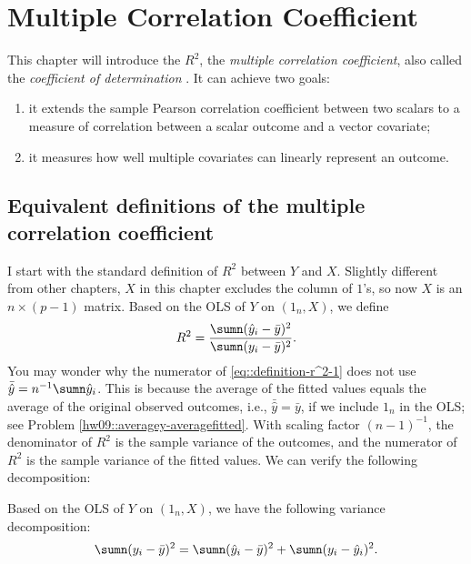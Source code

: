  
\chapter{Multiple Correlation Coefficient}
 
This chapter will introduce the $R^2$,  the {\it multiple correlation coefficient}, also called the {\it coefficient of determination} \citep{sewall1921correlation}. It can achieve two goals: 
\begin{enumerate}[label=(G\arabic*), ref=G\arabic*]
\item
it extends the sample Pearson correlation
coefficient between two scalars to a measure of correlation between a
scalar outcome and a vector covariate;

\item 
it measures how well multiple covariates
can linearly represent an outcome.
\end{enumerate}


  
 

\section{Equivalent definitions of the multiple correlation coefficient}

I start with the standard definition of $R^{2}$ between $Y$ and $X$.  
Slightly different from other chapters, $X$ in this chapter excludes the column of $1$'s, so now $X$ is an $n\times (p-1)$ matrix. Based on the OLS of $Y$ on $(1_n, X)$, we define 
\begin{equation}
\label{eq::definition-r^2-1}
R^{2}=\frac{\sumn(\hat{y}_{i}-\bar{y})^{2}}{\sumn(y_{i}-\bar{y})^{2}}.
\end{equation}
You may wonder why the numerator of \eqref{eq::definition-r^2-1} does not use $\bar{\hat{y}} = n^{-1}\sumn\hat{y}_{i}$. This is because the average of the fitted values equals the average of the original observed
outcomes, i.e., $\bar{\hat{y}}  = \bar{y}$, if we include $1_{n}$ in the OLS; see Problem \ref{hw09::averagey-averagefitted}. 
With scaling factor $(n-1)^{-1}$, the denominator
of $R^{2}$ is the sample variance of the outcomes, and the numerator
of $R^{2}$ is the sample variance of the fitted values. We can verify
the following decomposition:
\begin{lemma} 
\label{lemma:The-total-sum}
Based on the OLS of $Y$ on $(1_n, X)$, we have the following variance decomposition: 
\[
\sumn(y_{i}-\bar{y})^{2}=\sumn(\hat{y}_{i}-\bar{y})^{2}+\sumn(y_{i}-\hat{y}_{i})^{2}.
\]
\end{lemma}

